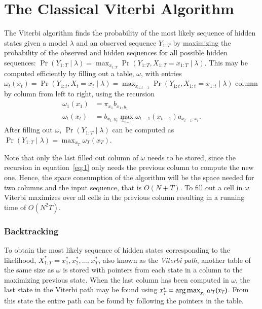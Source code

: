 \section{The Classical Viterbi Algorithm}
\label{sec:class-viterbi-algor}

The Viterbi algorithm finds the probability of the most likely sequence of
hidden states given a model $\lambda$ and an observed sequence $Y_{1:T}$ by
maximizing the probability of the observed and hidden sequences for all
possible hidden sequences: $\Pr(Y_{1:T} \mid \lambda) = \max_{x_{1:T}}
\Pr(Y_{1:T}, X_{1:T} = x_{1:T} \mid \lambda)$. This may be computed efficiently
by filling out a table, $\omega$, with entries $\omega_t(x_t) = \Pr(Y_{1:t},
X_t = x_t \mid \lambda) = \max_{x_{1:t-1}} \Pr(Y_{1:t}, X_{1:t} = x_{1:t} \mid
\lambda)$ column by column from left to right, using the recursion
\begin{equation}
  \label{eq:1}
  \begin{aligned}
    \omega_1(x_1) &= \pi_{x_1} b_{x_1, y_1} \\
    \omega_t(x_t) &= b_{x_t, y_t} \max_{x_{t - 1}} \omega_{t - 1}(x_{t - 1})
    a_{x_{t - 1}, x_t}.
  \end{aligned}
\end{equation}
After filling out $\omega$, $\Pr(Y_{1:T} \mid \lambda)$ can be computed as
$\Pr(Y_{1:T} \mid \lambda) = \max_{x_T} \omega_T(x_T)$.

Note that only the last filled out column of $\omega$ needs to be stored, since
the recursion in equation~\eqref{eq:1} only needs the previous column to
compute the new one. Hence, the space consumption of the algorithm will be the
space needed for two columns and the input sequence, that is $O(N + T)$. To
fill out a cell in $\omega$ Viterbi maximizes over all cells in the previous
column resulting in a running time of $O(N^2 T)$.

\subsubsection{Backtracking}
\label{sec:backtracking-1}

To obtain the most likely sequence of hidden states corresponding to the
likelihood, $X_{1:T}^* = x_1^*, x_2^*, \dots, x_T^*$, also known as the
\emph{Viterbi path}, another table of the same size as $\omega$ is stored with
pointers from each state in a column to the maximizing previous state. When the
last column has been computed in $\omega$, the last state in the Viterbi path
may be found using $x_T^* = \operatorname*{arg\,max}_{x_T} \omega_T(x_T)$. From this state the entire
path can be found by following the pointers in the table.

